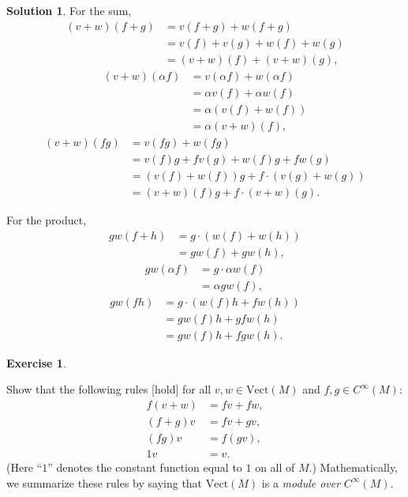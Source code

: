\documentclass[11pt, a4paper]{article}
\theoremstyle{definition}
\newtheorem{ex}{Exercise}[part]
\newtheorem{sol}{Solution}[part]
\begin{document}
\begin{sol}

For the sum,
\begin{align*}
    (v + w)(f + g) &= v(f + g) + w(f + g) \\
                   &= v(f) + v(g) + w(f) + w(g) \\
                   &= (v + w)(f) + (v + w)(g),
\end{align*}
\begin{align*}
    (v + w)(\alpha f) &= v(\alpha f) + w(\alpha f) \\
                      &= \alpha v(f) + \alpha w(f) \\
                      &= \alpha (v(f) + w(f)) \\
                      &= \alpha (v + w)(f),
\end{align*}
\begin{align*}
    (v + w)(fg) &= v(fg) + w(fg) \\
                &= v(f)g + fv(g) + w(f)g + fw(g) \\
                &= (v(f) + w(f))g + f \cdot (v(g) + w(g)) \\
                &= (v + w)(f)g + f \cdot (v + w)(g).
\end{align*}

For the product,
\begin{align*}
    gw(f + h) &= g \cdot (w(f) + w(h)) \\
              &= gw(f) + gw(h),
\end{align*}
\begin{align*}
    gw(\alpha f) &= g \cdot \alpha w(f) \\
        &= \alpha g w(f),
\end{align*}
\begin{align*}
    gw(fh) &= g \cdot (w(f)h + f w(h)) \\
           &= g w(f) h + g f w(h) \\
           &= gw(f) h + fgw(h).
\end{align*}

\end{sol}

\begin{ex}\label{ex:module}

Show that the following rules [hold] for all $v, w \in \text{Vect}(M)$ and $f, g \in C^\infty(M)$:
\begin{align*}
    f(v + w) &= fv + fw, \\
    (f + g)v &= fv + gv, \\
    (fg)v &= f(gv), \\
    1v &= v.
\end{align*}
(Here ``$1$'' denotes the constant function equal to $1$ on all of $M$.) Mathematically, we summarize these rules by saying that $\text{Vect}(M)$ is a \emph{module over} $C^\infty(M)$.

\end{ex}
\end{document}
